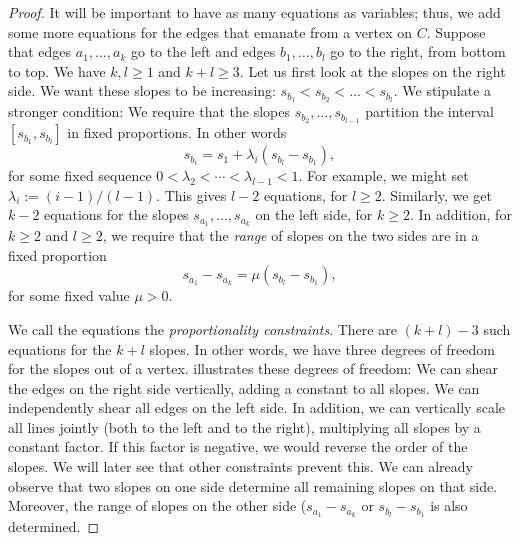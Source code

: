 \begin{proof}
It will be important to have as many equations as variables;
thus, we add some more equations for the edges that emanate from a
vertex on $C$.
Suppose that edges $a_1,\ldots,a_k$ 
go to the left and edges $b_1,\ldots,b_l$ go to the
right, from bottom to top.
We have $k,l\ge1$ and $k+l\ge 3$.
Let us first look at the slopes on the right side.
We want these slopes to be increasing:
$s_{b_1} < s_{b_2} < \dots  <s_{b_l}$. We stipulate a stronger
condition:
We require that the slopes
$s_{b_2}, \dots, s_{b_{l-1}}$ partition the interval
$[s_{b_1},s_{b_l}]$ in fixed proportions. In other words
\begin{equation}
  \label{eq:proportion}
s_{b_i} = s_1 + \lambda_i(s_{b_{l}}-s_{b_1}),
\end{equation}
for some fixed sequence $0<\lambda_2<\cdots<\lambda_{l-1}<1$.
For example, we might set $\lambda_i := (i-1)/(l-1)$.
This gives $l-2$ equations, for $l\ge 2$. Similarly, we get
$k-2$ equations for the slopes
$s_{a_1}, \dots, s_{a_{k}}$ on the left side, for $k\ge 2$.
In addition, for $k\ge 2$ and $l\ge 2$, we require that the \emph{range} of
slopes
on the two sides are in a fixed proportion
\begin{equation}
  \label{eq:proportion2}
s_{a_1}-s_{a_{k}} = \mu (s_{b_{l}}-s_{b_1}),
\end{equation}
for some fixed value $\mu>0$.

We call the equations
\thetag{\ref{eq:proportion}--\ref{eq:proportion2}} the
\emph{proportionality constraints}.
There are $(k+l)-3$ such equations for the $k+l$ slopes. In
other words, we have three degrees of freedom for the slopes out of a vertex.
 illustrates these  degrees of freedom:
We can shear the edges on the right side vertically, adding a constant to all
slopes.
 We can independently shear all edges on the left side.
In addition, we can vertically scale {all} lines jointly (both to
the left and to the right), multiplying all slopes by a constant factor.
If this factor is negative, we would reverse the order of the
slopes. We will later see that other constraints prevent this.
We can already observe that two slopes on one side determine all
remaining slopes on that side. Moreover, the range of slopes
on the other side
($s_{a_1}-s_{a_{k}}$ or $s_{b_{l}}-s_{b_1}$ is also determined.



\end{proof}
